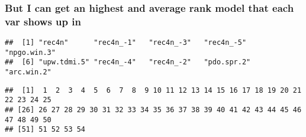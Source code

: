 \documentclass[
]{article}
\newenvironment{Shaded}{\begin{snugshade}}{\end{snugshade}}
\newcommand{\FunctionTok}[1]{\textcolor[rgb]{0.00,0.00,0.00}{#1}}
\newcommand{\NormalTok}[1]{#1}
\newcommand{\SpecialCharTok}[1]{\textcolor[rgb]{0.00,0.00,0.00}{#1}}
\begin{document}
\hypertarget{but-i-can-get-an-highest-and-average-rank-model-that-each-var-shows-up-in}{%
\subsubsection{But I can get an highest and average rank model that each
var shows up
in}\label{but-i-can-get-an-highest-and-average-rank-model-that-each-var-shows-up-in}}

\begin{Shaded}
\end{Shaded}

\begin{verbatim}
##  [1] "rec4n"      "rec4n_-1"   "rec4n_-3"   "rec4n_-5"   "npgo.win.3"
##  [6] "upw.tdmi.5" "rec4n_-4"   "rec4n_-2"   "pdo.spr.2"  "arc.win.2"
\end{verbatim}

\begin{Shaded}
\end{Shaded}

\begin{verbatim}
##  [1]  1  2  3  4  5  6  7  8  9 10 11 12 13 14 15 16 17 18 19 20 21 22 23 24 25
## [26] 26 27 28 29 30 31 32 33 34 35 36 37 38 39 40 41 42 43 44 45 46 47 48 49 50
## [51] 51 52 53 54
\end{verbatim}
\end{document}
